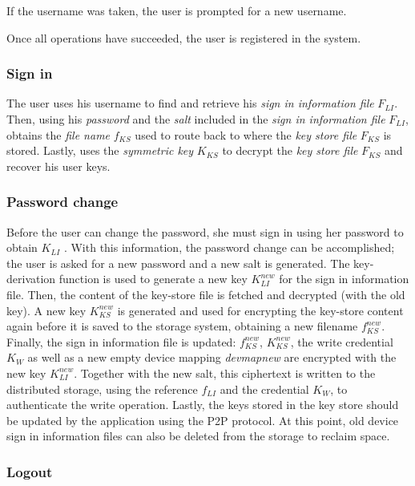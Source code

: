 If the username was taken,
the user is prompted for a new username.

Once all operations
have succeeded, the user is registered in the system.


\subsubsection{Sign in}
The user uses his username to find and retrieve his \textit{sign in information
file} $F_{LI}$. Then, using his \textit{password} and the \textit{salt} included in the
\textit{sign in information file} $F_{LI}$, obtains the \textit{file name}
$f_{KS}$ used to
route back to where the \textit{key store file} $F_{KS}$ is stored.  Lastly, uses the
\textit{symmetric key} $K_{KS}$ to decrypt the \textit{key store file}
$F_{KS}$ and recover his user keys.

\subsubsection{Password change}


Before the user can change the password, she must sign in using her password to
obtain $K_{LI}$ . With this information, the password change can be
accomplished; the user is asked for a new password and a new salt is
generated. The key-derivation function is used to generate a new key
$K_{LI}^{new}$
for the sign in information file. Then, the content of the key-store file is
fetched and decrypted (with the old key). A new key $K_{KS}^{new}$ is generated and
used for encrypting the key-store content again before it is saved to the
storage system, obtaining a new filename $f_{KS}^{new}$.
Finally, the sign in information file
is updated: $f_{KS}^{new}$, $K_{KS}^{new}$, the write credential $K_{W}$ as well as a new empty
device mapping \textit{devmapnew} are encrypted with the new key $K_{LI}^{new}$.
  Together with the new salt, this ciphertext is written to the distributed
storage, using the reference $f_{LI}$ and the credential $K_W$, to authenticate the
write operation. Lastly, the keys stored in the key store should be updated by
the application using the P2P protocol.  At this point, old device sign in
information files can also be deleted from the
storage to reclaim space.

\subsubsection{Logout}

